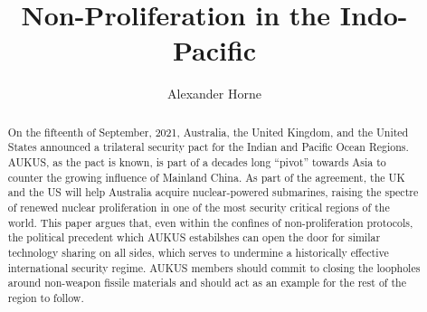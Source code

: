 \documentclass[letterpaper,12pt,twoside]{article} %
\title{\display Non-Proliferation in the Indo-Pacific}
\author{Alexander Horne}
\date{} %
\begin{document}
\begin{titlepage}
  \maketitle
\vfill

\renewcommand{\abstractname}{\sc\large Executive Summary}
\begin{abstract}

    On the fifteenth of September, 2021, Australia, the United Kingdom, and the United States announced a trilateral security pact for the Indian and Pacific Ocean Regions. AUKUS, as the pact is known, is part of a decades long ``pivot'' towards Asia to counter the growing influence of Mainland China. As part of the agreement, the UK and the US will help Australia acquire nuclear-powered submarines, raising the spectre of renewed nuclear proliferation in one of the most security critical regions of the world. This paper argues that, even within the confines of non-proliferation protocols, the political precedent which AUKUS estabilshes can open the door for similar technology sharing on all sides, which serves to undermine a historically effective international security regime. AUKUS members should commit to closing the loopholes around non-weapon fissile materials and should act as an example for the rest of the region to follow.

\end{abstract}

\end{titlepage}

{\hypersetup{hidelinks}
  \tableofcontents
}
  \vfill
  \pagebreak
\end{document}
